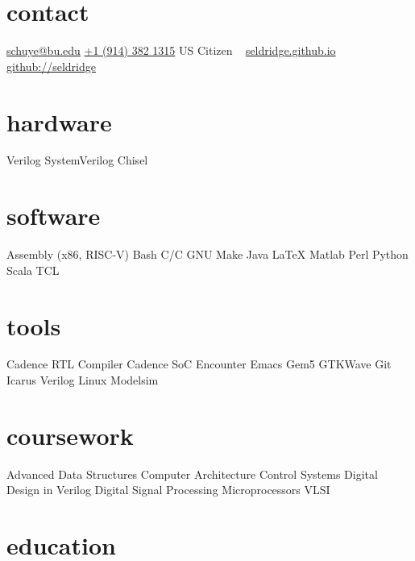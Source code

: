 \documentclass[]{friggeri-cv} %
\begin{document}


\newcommand{\CPP}
{C\nolinebreak[4]\hspace{-.05em}\raisebox{.22ex}{\footnotesize ++}\xspace}

\begin{aside} %
\section{contact}
\href{mailto:schuye@bu.edu}{schuye@bu.edu}
\href{tel:+19143821315}{+1 (914) 382 1315}
US Citizen
~
\href{https://seldridge.github.io}{seldridge.github.io}
\href{http://github.com/seldridge}{github://seldridge}
\section{hardware}
Verilog
SystemVerilog
Chisel
\section{software}
Assembly (x86, RISC-V)
Bash
C/\CPP
GNU Make
Java
\LaTeX
Matlab
Perl
Python
Scala
TCL
\section{tools}
Cadence RTL Compiler
Cadence SoC Encounter
Emacs
Gem5
GTKWave
Git
Icarus Verilog
Linux
Modelsim
\section{coursework}
Advanced Data Structures
Computer Architecture
Control Systems
Digital Design in Verilog
Digital Signal Processing
Microprocessors
VLSI
\end{aside}


\section{education}
\end{document}
